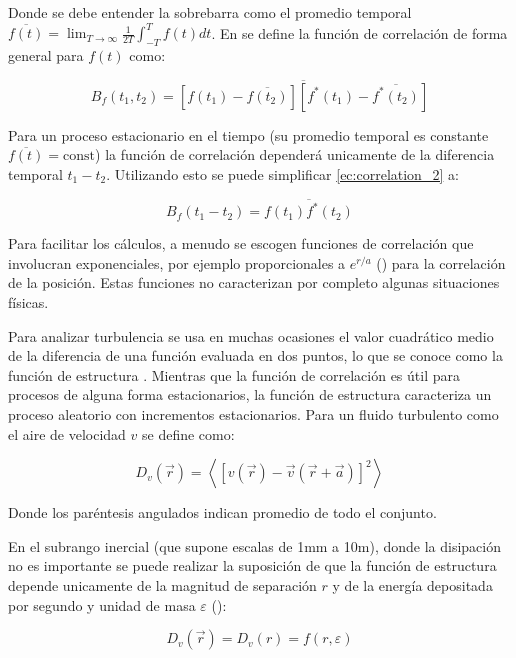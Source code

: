 Donde se debe entender la sobrebarra como el promedio temporal $\overline{f(t)} = \lim_{T\rightarrow{\infty}} \frac{1}{2T}\int_{-T}^T f(t)dt$. En \cite{tatarski_wave_1967} se define la función de correlación de forma general para $f(t)$ como:

\begin{equation}\label{ec:correlation_2}
    B_f(t_1, t_2) = \overline{[f(t_1) - \overline{f(t_2)}][f^*(t_1) - \overline{f^*(t_2)}]}
\end{equation}

Para un proceso estacionario en el tiempo (su promedio temporal es constante $\overline{f(t)} = \text{const}$) la función de correlación dependerá unicamente de la diferencia temporal $t_1 - t_2$. Utilizando esto se puede simplificar \ref{ec:correlation_2} a:

\begin{equation}
    B_f(t_1 -t_2) = \overline{f(t_1)f^*(t_2)}
\end{equation}

Para facilitar los cálculos, a menudo se escogen funciones de correlación que involucran exponenciales, por ejemplo proporcionales a $e^{r/a}$ (\cite{chernov_wave_1967}) para la correlación de la posición. Estas funciones no caracterizan por completo algunas situaciones físicas. 

Para analizar turbulencia se usa en muchas ocasiones el valor cuadrático medio de la diferencia de una función evaluada en dos puntos, lo que se conoce como la función de estructura \cite{sasiela_electromagnetic_2007}. Mientras que la función de correlación es útil para procesos de alguna forma estacionarios, la función de estructura caracteriza un proceso aleatorio
con incrementos estacionarios. Para un fluido turbulento como el aire de velocidad $v$ se define como:

\begin{equation}
    D_v(\vec{r}) = \left\langle{[v(\vec{r}) - \vec{v}(\vec{r}+\vec{a})]^2}\right\rangle
\end{equation}

Donde los paréntesis angulados indican promedio de todo el conjunto. 

En el subrango inercial (que supone escalas de 1mm a 10m), donde la disipación no es importante se puede realizar la suposición de que la función de estructura depende unicamente de la magnitud de separación $r$ y de la energía depositada por segundo y unidad de masa $\varepsilon$ (\cite{kolmogorov_local_1941}):

\begin{equation}
    D_v(\vec{r}) = D_v(r) = f(r,\varepsilon)
\end{equation}

